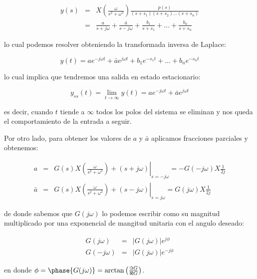     \begin{eqnarray*}
        y(s) & = & X \left( \frac{\omega}{s^2 + \omega^2} \right) \frac{p(s)}{(s + s_1) (s + s_2) \dots (s + s_n)} \\
        & = & \frac{a}{s + j \omega} + \frac{\bar{a}}{s - j \omega} + \frac{b_1}{s + s_1} + \dots + \frac{b_n}{s + s_n}
    \end{eqnarray*}

    lo cual podemos resolver obteniendo la transformada inversa de Laplace:

    \begin{equation*}
        y(t) = a e^{-j \omega t} + \bar{a} e^{j \omega t} + b_1 e^{-s_1 t} + \dots + b_n e^{-s_n t}
    \end{equation*}

    lo cual implica que tendremos una salida en estado estacionario:

    \begin{equation*}
        y_{ss}(t) = \lim_{t \to \infty} y(t) = a e^{-j \omega t} + \bar{a} e ^{j \omega t}
    \end{equation*}

    es decir, cuando $t$ tiende a $\infty$ todos los polos del sistema se eliminan y nos queda el comportamiento de la entrada a seguir.

    Por otro lado, para obtener los valores de $a$ y $\bar{a}$ aplicamos fracciones parciales y obtenemos:

    \begin{eqnarray*}
        a & = & \left. G(s) X \left( \frac{\omega}{s^2 + \omega^2} \right) + (s + j \omega) \right|_{s=-j \omega} = - G(-j \omega) X \frac{1}{2j} \\
        \bar{a} & = & \left. G(s) X \left( \frac{\omega}{s^2 + \omega^2} \right) + (s - j \omega) \right|_{s=j \omega} = G(j \omega) X \frac{1}{2j}
    \end{eqnarray*}

    de donde sabemos que $G(j \omega)$ lo podemos escribir como su magnitud multiplicado por una exponencial de mangitud unitaria con el angulo deseado:

    \begin{eqnarray*}
        G(j \omega) & = & \left| G(j \omega) \right| e^{j \phi} \\
        G(-j \omega) & = & \left| G(j \omega) \right| e^{-j \phi}
    \end{eqnarray*}

    en donde $\phi = \phase{G(j \omega)} = \arctan{\left( \frac{\Im{G}}{\Re{G}} \right)}$.

